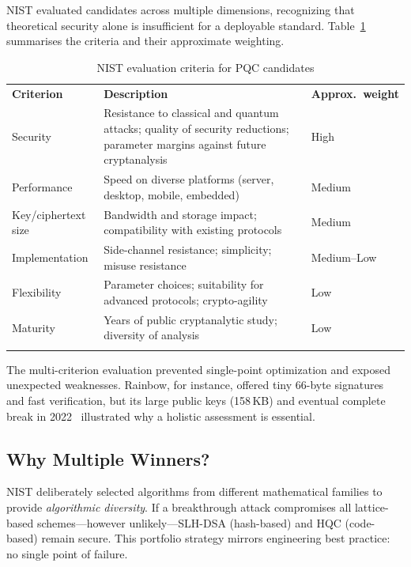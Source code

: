 NIST evaluated candidates across multiple dimensions, recognizing that theoretical security alone is insufficient for a deployable standard.  Table~\ref{tab:nist-criteria} summarises the criteria and their approximate weighting.

\begin{table}[t]
\caption{NIST evaluation criteria for PQC candidates}
\label{tab:nist-criteria}
\begin{tabular}{p{2.8cm}p{6cm}p{1.8cm}}
\hline\noalign{\smallskip}
\textbf{Criterion} & \textbf{Description} & \textbf{Approx.\ weight} \\
\noalign{\smallskip}\svhline\noalign{\smallskip}
Security           & Resistance to classical and quantum attacks; quality of security reductions; parameter margins against future cryptanalysis & High \\
Performance        & Speed on diverse platforms (server, desktop, mobile, embedded) & Medium \\
Key/ciphertext size & Bandwidth and storage impact; compatibility with existing protocols & Medium \\
Implementation     & Side-channel resistance; simplicity; misuse resistance & Medium--Low \\
Flexibility        & Parameter choices; suitability for advanced protocols; crypto-agility & Low \\
Maturity           & Years of public cryptanalytic study; diversity of analysis & Low \\
\noalign{\smallskip}\hline
\end{tabular}
\end{table}

The multi-criterion evaluation prevented single-point optimization and exposed unexpected weaknesses.  Rainbow, for instance, offered tiny 66-byte signatures and fast verification, but its large public keys (158\,KB) and eventual complete break in 2022~\cite{Beullens2022} illustrated why a holistic assessment is essential.

\subsection{Why Multiple Winners?}
\label{subsec:nist-diversity}

NIST deliberately selected algorithms from different mathematical families to provide \emph{algorithmic diversity}.  If a breakthrough attack compromises all lattice-based schemes---however unlikely---SLH-DSA (hash-based) and HQC (code-based) remain secure.  This portfolio strategy mirrors engineering best practice: no single point of failure.

